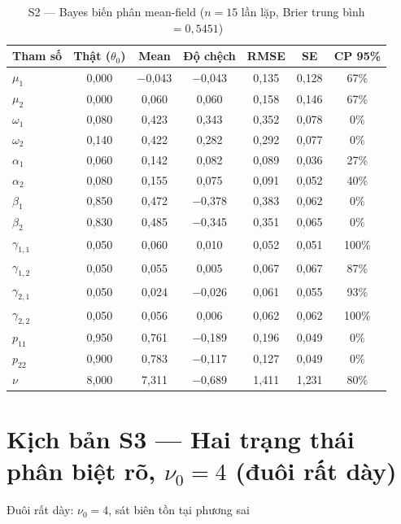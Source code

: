 \documentclass[11pt,a4paper]{article}
\begin{document}
\begin{table}[H]\centering\scriptsize
\caption{S2 --- Bayes biến phân mean-field ($n=15$ lần lặp, Brier trung bình $=0{,}5451$)}
\begin{tabularx}{\textwidth}{l C C C C C C}
\toprule
\textbf{Tham số} & \textbf{Thật ($\theta_0$)} & \textbf{Mean} & \textbf{Độ chệch} & \textbf{RMSE} & \textbf{SE} & \textbf{CP 95\%} \\
\midrule
$\mu_1$ & 0{,}000 & $-$0{,}043 & $-$0{,}043 & 0{,}135 & 0{,}128 & 67\% \\
$\mu_2$ & 0{,}000 & 0{,}060 & 0{,}060 & 0{,}158 & 0{,}146 & 67\% \\
$\omega_1$ & 0{,}080 & 0{,}423 & 0{,}343 & 0{,}352 & 0{,}078 & 0\% \\
$\omega_2$ & 0{,}140 & 0{,}422 & 0{,}282 & 0{,}292 & 0{,}077 & 0\% \\
$\alpha_1$ & 0{,}060 & 0{,}142 & 0{,}082 & 0{,}089 & 0{,}036 & 27\% \\
$\alpha_2$ & 0{,}080 & 0{,}155 & 0{,}075 & 0{,}091 & 0{,}052 & 40\% \\
$\beta_1$ & 0{,}850 & 0{,}472 & $-$0{,}378 & 0{,}383 & 0{,}062 & 0\% \\
$\beta_2$ & 0{,}830 & 0{,}485 & $-$0{,}345 & 0{,}351 & 0{,}065 & 0\% \\
$\gamma_{1,1}$ & 0{,}050 & 0{,}060 & 0{,}010 & 0{,}052 & 0{,}051 & 100\% \\
$\gamma_{1,2}$ & 0{,}050 & 0{,}055 & 0{,}005 & 0{,}067 & 0{,}067 & 87\% \\
$\gamma_{2,1}$ & 0{,}050 & 0{,}024 & $-$0{,}026 & 0{,}061 & 0{,}055 & 93\% \\
$\gamma_{2,2}$ & 0{,}050 & 0{,}056 & 0{,}006 & 0{,}062 & 0{,}062 & 100\% \\
$p_{11}$ & 0{,}950 & 0{,}761 & $-$0{,}189 & 0{,}196 & 0{,}049 & 0\% \\
$p_{22}$ & 0{,}900 & 0{,}783 & $-$0{,}117 & 0{,}127 & 0{,}049 & 0\% \\
$\nu$ & 8{,}000 & 7{,}311 & $-$0{,}689 & 1{,}411 & 1{,}231 & 80\% \\
\bottomrule
\end{tabularx}
\end{table}

\bigskip
\section*{Kịch bản S3 --- Hai trạng thái phân biệt rõ, $\nu_0=4$ (đuôi rất dày)}
Đuôi rất dày: $\nu_0=4$, sát biên tồn tại phương sai
\end{document}
